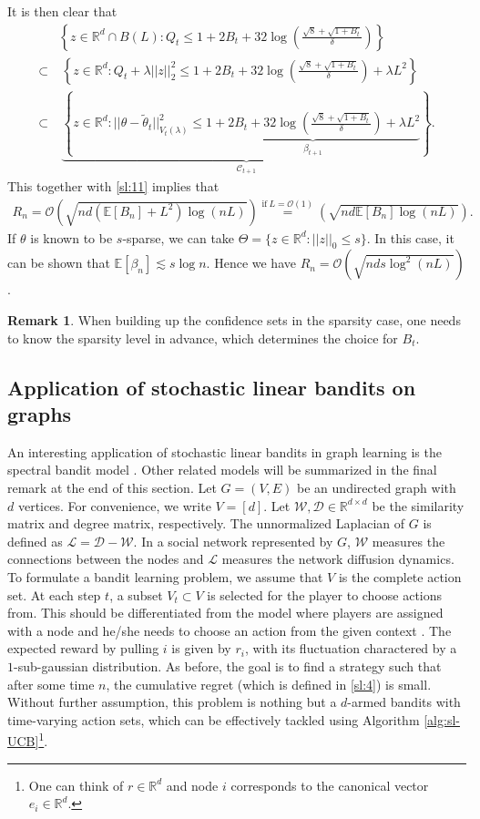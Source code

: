 \documentclass[10pt,a4article]{article}
\numberwithin{equation}{section}
\theoremstyle{plain}
\theoremstyle{definition}
\newtheorem{Rem}[Th]{Remark}
\def\R{{\mathbb R}}
\def\E{{\mathbb E}}
\def\R{{\mathbb R}}
\def\t{{\theta}}
\begin{document}
It is then clear that 
\begin{align*}
&\left\{z\in\R^d\cap B(L): Q_t\leq 1+2B_t+32\log\left(\frac{\sqrt{8}+\sqrt{1+B_t}}{\delta}\right) \right\}\\
\subset&\ \left\{z\in\R^d: Q_t +\lambda ||z||_2^2\leq 1+2B_t+32\log\left(\frac{\sqrt{8}+\sqrt{1+B_t}}{\delta}\right) +\lambda L^2\right\}\\
\subset&\ \underbrace{\left\{z\in\R^d: ||\t-\tilde\t_t||^2_{V_t(\lambda)}\leq \underbrace{1+2B_t+32\log\left(\frac{\sqrt{8}+\sqrt{1+B_t}}{\delta}\right)+\lambda L^2}_{\beta_{t+1}} \right\}}_{\mathcal C_{t+1}}. 
\end{align*}
This together with \eqref{sl:11} implies that 
\begin{align*}
R_n = \mathcal O \left(\sqrt{nd(\E[B_n]+L^2)\log(nL)}\right)\stackrel{\text{if}\ L=\mathcal O(1)}{=}\left(\sqrt{nd\E[B_n]\log(nL)}\right).
\end{align*}
If $\t$ is known to be $s$-sparse, we can take $\Theta = \{z\in\R^d: ||z||_0\leq s\}$. In this case, it can be shown that $\E[\beta_n] \lesssim s\log n$. Hence we have $R_n = \mathcal O \left(\sqrt{nds\log^2(nL)}\right)$.
\begin{Rem}
When building up the confidence sets in the sparsity case, one needs to know the sparsity level in advance, which determines the choice for $B_t$. 
\end{Rem} 



\subsection{Application of stochastic linear bandits on graphs}
An interesting application of stochastic linear bandits in graph learning is the spectral bandit model \cite{valko2014spectral}. 
Other related models will be summarized in the final remark at the end of this section. 
Let $G=(V, E)$ be an undirected graph with $d$ vertices. 
For convenience, we write $V=[d]$. 
Let $\mathcal W, \mathcal D\in\R^{d\times d}$ be the similarity matrix and degree matrix, respectively. 
The unnormalized Laplacian of $G$ is defined as $\mathcal L=\mathcal D-\mathcal W$. 
In a social network represented by $G$, $\mathcal W$ measures the connections between the nodes and $\mathcal L$ measures the network diffusion dynamics. 
To formulate a bandit learning problem, we assume that $V$ is the complete action set.
At each step $t$, a subset $V_t\subset V$ is selected for the player to choose actions from.
This should be differentiated from the model where players are assigned with a node and he/she needs to choose an action from the given context \cite{cesa2013gang}.  
The expected reward by pulling $i$ is given by $r_i$, with its fluctuation charactered by a $1$-sub-gaussian distribution. 
As before, the goal is to find a strategy such that after some time $n$, the cumulative regret (which is defined in \eqref{sl:4}) is small.  
Without further assumption, this problem is nothing but a $d$-armed bandits with time-varying action sets, which can be effectively tackled using Algorithm \ref{alg:sl-UCB}\footnote{One can think of $r\in\R^d$ and node $i$ corresponds to the canonical vector $e_i\in\R^d$. }. 
\end{document}
